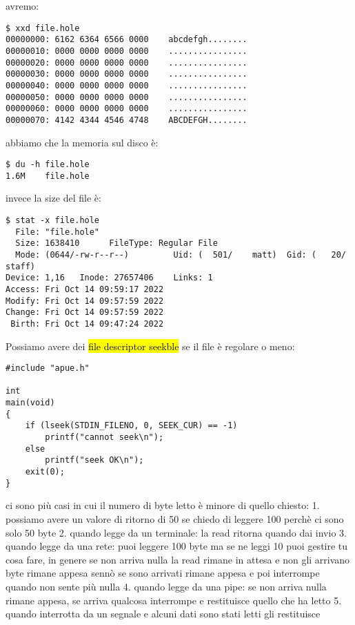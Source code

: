 avremo:

\begin{lstlisting}
$ xxd file.hole
00000000: 6162 6364 6566 0000    abcdefgh........
00000010: 0000 0000 0000 0000    ................
00000020: 0000 0000 0000 0000    ................
00000030: 0000 0000 0000 0000    ................
00000040: 0000 0000 0000 0000    ................
00000050: 0000 0000 0000 0000    ................
00000060: 0000 0000 0000 0000    ................
00000070: 4142 4344 4546 4748    ABCDEFGH........
\end{lstlisting}

abbiamo che la memoria sul disco è:

\begin{lstlisting}
$ du -h file.hole 
1.6M	file.hole
\end{lstlisting}

invece la size del file è:

\begin{lstlisting}
$ stat -x file.hole 
  File: "file.hole"
  Size: 1638410      FileType: Regular File
  Mode: (0644/-rw-r--r--)         Uid: (  501/    matt)  Gid: (   20/   staff)
Device: 1,16   Inode: 27657406    Links: 1
Access: Fri Oct 14 09:59:17 2022
Modify: Fri Oct 14 09:57:59 2022
Change: Fri Oct 14 09:57:59 2022
 Birth: Fri Oct 14 09:47:24 2022
\end{lstlisting}

Possiamo avere dei \hl{file descriptor seekble} se il file è regolare o meno:

\begin{lstlisting}
#include "apue.h"

int
main(void)
{
	if (lseek(STDIN_FILENO, 0, SEEK_CUR) == -1)
		printf("cannot seek\n");
	else
		printf("seek OK\n");
	exit(0);
}
\end{lstlisting}








ci sono più casi in cui il numero di byte letto è minore di quello chiesto:
1. possiamo avere un valore di ritorno di 50 se chiedo di leggere 100 perchè ci sono solo 50 byte
2. quando legge da un terminale: la read ritorna quando dai invio
3. quando legge da una rete: puoi leggere 100 byte ma se ne leggi 10 puoi gestire tu cosa fare, in genere se non arriva nulla la read rimane in attesa e non gli arrivano byte rimane appesa sennò se sono arrivati rimane appesa e poi interrompe quando non sente più nulla
4. quando legge da una pipe: se non arriva nulla rimane appesa, se arriva qualcosa interrompe e restituisce quello che ha letto
5. quando interrotta da un segnale e alcuni dati sono stati letti gli restituisce








